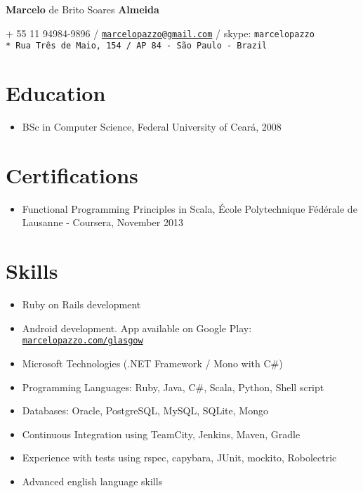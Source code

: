 \documentclass[letterpaper]{article}
\def\name{\textbf{Marcelo} de Brito Soares \textbf{Almeida}}
\begin{document}
\begin{flushright}

{\huge \name}

\vspace{0.05in}
+ 55 11 94984-9896 / \href{mailto:marcelopazzo@gmail.com}{\tt marcelopazzo@gmail.com} / skype: \tt marcelopazzo
\vspace{0.01in} \\* 
Rua Três de Maio, 154 / AP 84 - São Paulo - Brazil

\end{flushright}

\section*{Education}
\begin{itemize}
  \item BSc in Computer Science, Federal University of Ceará, 2008
\end{itemize}

\section*{Certifications}
\begin{itemize}
  \item Functional Programming Principles in Scala, École Polytechnique Fédérale de Lausanne - Coursera, November 2013
\end{itemize}

\section*{Skills}
\begin{itemize}
  \item Ruby on Rails development
  \item Android development. App available on Google Play: \href{http://marcelopazzo.com/glasgow/}{\tt marcelopazzo.com/glasgow}
  \item Microsoft Technologies (.NET Framework / Mono with C\#) 
  \item Programming Languages: Ruby, Java, C\#, Scala, Python, Shell script
  \item Databases: Oracle, PostgreSQL, MySQL, SQLite, Mongo
  \item Continuous Integration using TeamCity, Jenkins, Maven, Gradle
  \item Experience with tests using rspec, capybara, JUnit, mockito, Robolectric
  \item Advanced english language skills
\end{itemize}
\end{document}
